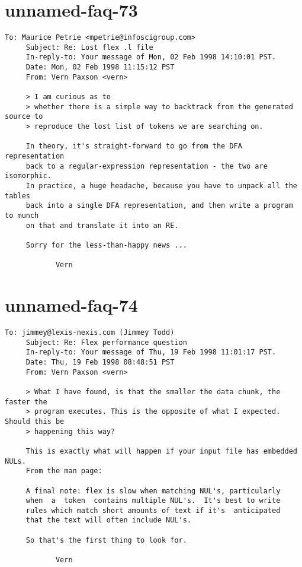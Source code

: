 \documentclass[openany,oneside]{book}
\begin{document}
\section{unnamed-faq-73}

\begin{verbatim}
To: Maurice Petrie <mpetrie@infoscigroup.com>
     Subject: Re: Lost flex .l file
     In-reply-to: Your message of Mon, 02 Feb 1998 14:10:01 PST.
     Date: Mon, 02 Feb 1998 11:15:12 PST
     From: Vern Paxson <vern>
     
     > I am curious as to
     > whether there is a simple way to backtrack from the generated source to
     > reproduce the lost list of tokens we are searching on.
     
     In theory, it's straight-forward to go from the DFA representation
     back to a regular-expression representation - the two are isomorphic.
     In practice, a huge headache, because you have to unpack all the tables
     back into a single DFA representation, and then write a program to munch
     on that and translate it into an RE.
     
     Sorry for the less-than-happy news ...
     
     		Vern
\end{verbatim}

\section{unnamed-faq-74}

\begin{verbatim}
To: jimmey@lexis-nexis.com (Jimmey Todd)
     Subject: Re: Flex performance question
     In-reply-to: Your message of Thu, 19 Feb 1998 11:01:17 PST.
     Date: Thu, 19 Feb 1998 08:48:51 PST
     From: Vern Paxson <vern>
     
     > What I have found, is that the smaller the data chunk, the faster the
     > program executes. This is the opposite of what I expected. Should this be
     > happening this way?
     
     This is exactly what will happen if your input file has embedded NULs.
     From the man page:
     
     A final note: flex is slow when matching NUL's, particularly
     when  a  token  contains multiple NUL's.  It's best to write
     rules which match short amounts of text if it's  anticipated
     that the text will often include NUL's.
     
     So that's the first thing to look for.
     
     		Vern
\end{verbatim}
\end{document}
